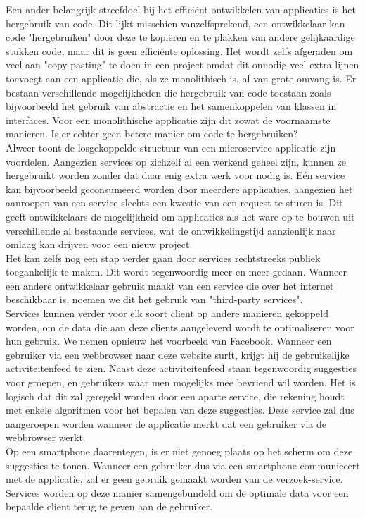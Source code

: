 \documentclass[pdftex,a4paper,12pt,twoside]{report}
\begin{document}
Een ander belangrijk streefdoel bij het efficiënt ontwikkelen van applicaties is het hergebruik van code. Dit lijkt misschien vanzelfsprekend, een ontwikkelaar kan code "hergebruiken" door deze te kopiëren en te plakken van andere gelijkaardige stukken code, maar dit is geen efficiënte oplossing. Het wordt zelfs afgeraden om veel aan "copy-pasting" te doen in een project omdat dit onnodig veel extra lijnen toevoegt aan een applicatie die, als ze monolithisch is, al van grote omvang is. Er bestaan verschillende mogelijkheden die hergebruik van code toestaan zoals bijvoorbeeld het gebruik van abstractie en het samenkoppelen van klassen in interfaces. Voor een monolithische applicatie zijn dit zowat de voornaamste manieren. Is er echter geen betere manier om code te hergebruiken?
\\
Alweer toont de losgekoppelde structuur van een microservice applicatie zijn voordelen. Aangezien services op zichzelf al een werkend geheel zijn, kunnen ze hergebruikt worden zonder dat daar enig extra werk voor nodig is. Eén service kan bijvoorbeeld geconsumeerd worden door meerdere applicaties, aangezien het aanroepen van een service slechts een kwestie van een request te sturen is. Dit geeft ontwikkelaars de mogelijkheid om applicaties als het ware op te bouwen uit verschillende al bestaande services, wat de ontwikkelingstijd aanzienlijk naar omlaag kan drijven voor een nieuw project.
\\
Het kan zelfs nog een stap verder gaan door services rechtstreeks publiek toegankelijk te maken. Dit wordt tegenwoordig meer en meer gedaan. Wanneer een andere ontwikkelaar gebruik maakt van een service die over het internet beschikbaar is, noemen we dit het gebruik van "third-party services".
\\
Services kunnen verder voor elk soort client op andere manieren gekoppeld worden, om de data die aan deze clients aangeleverd wordt te optimaliseren voor hun gebruik. We nemen opnieuw het voorbeeld van Facebook. Wanneer een gebruiker via een webbrowser naar deze website surft, krijgt hij de gebruikelijke activiteitenfeed te zien. Naast deze activiteitenfeed staan tegenwoordig suggesties voor groepen, en gebruikers waar men mogelijks mee bevriend wil worden. Het is logisch dat dit zal geregeld worden door een aparte service, die rekening houdt met enkele algoritmen voor het bepalen van deze suggesties. Deze service zal dus aangeroepen worden wanneer de applicatie merkt dat een gebruiker via de webbrowser werkt. 
\\
Op een smartphone daarentegen, is er niet genoeg plaats op het scherm om deze suggesties te tonen. Wanneer een gebruiker dus via een smartphone communiceert met de applicatie, zal er geen gebruik gemaakt worden van de verzoek-service. Services worden op deze manier samengebundeld om de optimale data voor een bepaalde client terug te geven aan de gebruiker.
\end{document}
